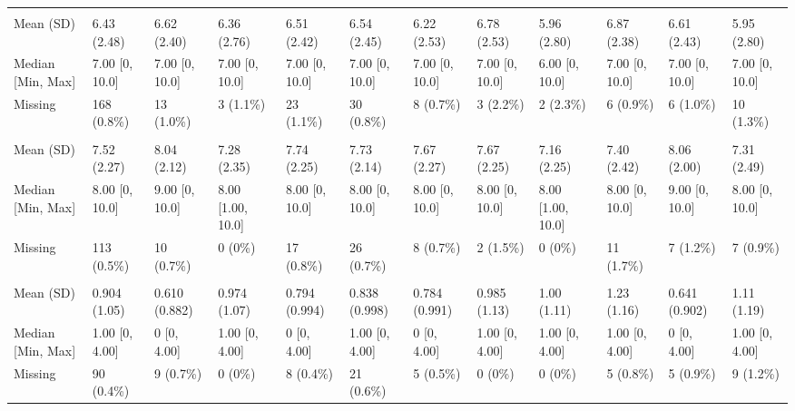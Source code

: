 \documentclass[
  single column]{article}
\begin{document}
\begin{landscape}
\begin{tabular}[t]{llllllllllll}
\addlinespace[0.3em]
\multicolumn{12}{l}{\textbf{pwb\_your\_health}}\\
\hspace{1em}Mean (SD) & 6.43 (2.48) & 6.62 (2.40) & 6.36 (2.76) & 6.51 (2.42) & 6.54 (2.45) & 6.22 (2.53) & 6.78 (2.53) & 5.96 (2.80) & 6.87 (2.38) & 6.61 (2.43) & 5.95 (2.80)\\
\hspace{1em}Median [Min, Max] & 7.00 [0, 10.0] & 7.00 [0, 10.0] & 7.00 [0, 10.0] & 7.00 [0, 10.0] & 7.00 [0, 10.0] & 7.00 [0, 10.0] & 7.00 [0, 10.0] & 6.00 [0, 10.0] & 7.00 [0, 10.0] & 7.00 [0, 10.0] & 7.00 [0, 10.0]\\
\hspace{1em}Missing & 168 (0.8\%) & 13 (1.0\%) & 3 (1.1\%) & 23 (1.1\%) & 30 (0.8\%) & 8 (0.7\%) & 3 (2.2\%) & 2 (2.3\%) & 6 (0.9\%) & 6 (1.0\%) & 10 (1.3\%)\\
\addlinespace[0.3em]
\multicolumn{12}{l}{\textbf{pwb\_your\_relationships}}\\
\hspace{1em}Mean (SD) & 7.52 (2.27) & 8.04 (2.12) & 7.28 (2.35) & 7.74 (2.25) & 7.73 (2.14) & 7.67 (2.27) & 7.67 (2.25) & 7.16 (2.25) & 7.40 (2.42) & 8.06 (2.00) & 7.31 (2.49)\\
\hspace{1em}Median [Min, Max] & 8.00 [0, 10.0] & 9.00 [0, 10.0] & 8.00 [1.00, 10.0] & 8.00 [0, 10.0] & 8.00 [0, 10.0] & 8.00 [0, 10.0] & 8.00 [0, 10.0] & 8.00 [1.00, 10.0] & 8.00 [0, 10.0] & 9.00 [0, 10.0] & 8.00 [0, 10.0]\\
\hspace{1em}Missing & 113 (0.5\%) & 10 (0.7\%) & 0 (0\%) & 17 (0.8\%) & 26 (0.7\%) & 8 (0.7\%) & 2 (1.5\%) & 0 (0\%) & 11 (1.7\%) & 7 (1.2\%) & 7 (0.9\%)\\
\addlinespace[0.3em]
\multicolumn{12}{l}{\textbf{Rumination}}\\
\hspace{1em}Mean (SD) & 0.904 (1.05) & 0.610 (0.882) & 0.974 (1.07) & 0.794 (0.994) & 0.838 (0.998) & 0.784 (0.991) & 0.985 (1.13) & 1.00 (1.11) & 1.23 (1.16) & 0.641 (0.902) & 1.11 (1.19)\\
\hspace{1em}Median [Min, Max] & 1.00 [0, 4.00] & 0 [0, 4.00] & 1.00 [0, 4.00] & 0 [0, 4.00] & 1.00 [0, 4.00] & 0 [0, 4.00] & 1.00 [0, 4.00] & 1.00 [0, 4.00] & 1.00 [0, 4.00] & 0 [0, 4.00] & 1.00 [0, 4.00]\\
\hspace{1em}Missing & 90 (0.4\%) & 9 (0.7\%) & 0 (0\%) & 8 (0.4\%) & 21 (0.6\%) & 5 (0.5\%) & 0 (0\%) & 0 (0\%) & 5 (0.8\%) & 5 (0.9\%) & 9 (1.2\%)\\

\end{tabular}
\end{landscape}
\end{document}
